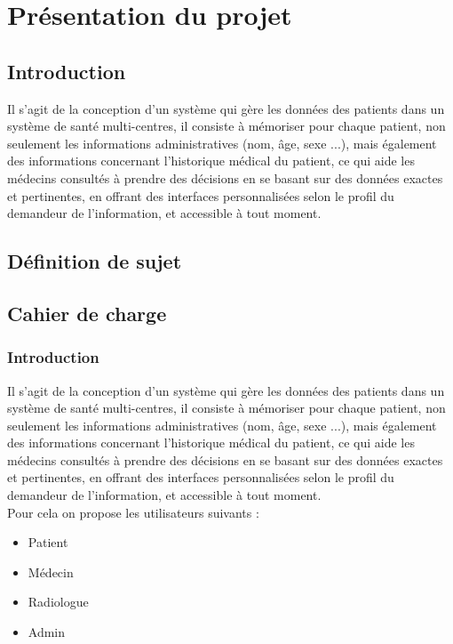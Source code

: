 \chapter{Présentation du projet}

\section{Introduction}

Il s’agit de la conception d’un système qui gère les données des patients dans un système de santé multi-centres, il consiste à mémoriser pour chaque patient, non seulement les informations administratives (nom, âge, sexe ...), mais également des informations concernant l’historique médical du patient, ce qui aide les médecins consultés à prendre des décisions en se basant sur des données exactes et pertinentes, en offrant des interfaces personnalisées selon le profil du demandeur de l’information, et accessible à tout moment. 


\section{Définition de sujet}



\section{Cahier de charge}

\subsection{Introduction}

Il s’agit de la conception d’un système qui gère les données des patients dans un système de santé multi-centres, il consiste à mémoriser pour chaque patient, non seulement les informations administratives (nom, âge, sexe ...), mais également des informations concernant l’historique médical du patient, ce qui aide les médecins consultés à prendre des décisions en se basant sur des données exactes et pertinentes, en offrant des interfaces personnalisées selon le profil du demandeur de l’information, et accessible à tout moment.\\
Pour cela on propose les utilisateurs suivants : 

\begin{itemize}
\item Patient
\item Médecin
\item Radiologue
\item Admin
\end{itemize}
 


